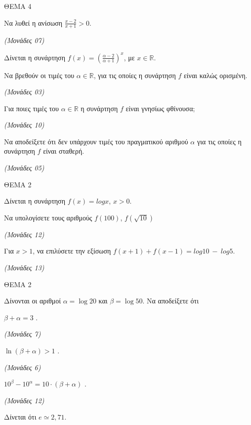\documentclass[11pt,a4paper,twoside]{book}
\newcommand{\monades}[1]{\hfill \textit{(Μονάδες #1)}}
\begin{document}
\vspace{4mm}

ΘΕΜΑ 4

\begin{alist}
\item Να λυθεί η ανίσωση $\frac{x - 2}{x + 1} > 0$.

\monades{07}

\item Δίνεται η συνάρτηση $f(x) = \left(\frac{\alpha - 2}{\alpha + 1}\right)^x$, με $x \in \mathbb{R}$.

\begin{rlist}
\item
  Να βρεθούν οι τιμές του $\alpha \in \mathbb{R}$, για τις οποίες η συνάρτηση $f$ είναι καλώς ορισμένη.

\monades{03}


\item
  Για ποιες τιμές του $\alpha \in \mathbb{R}$ η συνάρτηση $f$ είναι γνησίως φθίνουσα;

\monades{10}


\item
  Να αποδείξετε ότι δεν υπάρχουν τιμές του πραγματικού αριθμού $\alpha$ για τις οποίες η συνάρτηση $f$ είναι σταθερή.

\monades{05}
\end{rlist}
\end{alist}

\vspace{4mm}

ΘΕΜΑ 2

Δίνεται η συνάρτηση $f(x) = logx$, $x > 0$.

\begin{alist}
\item Να υπολογίσετε τους αριθμούς $f(100)$, $f\left( \sqrt{10} \right)$

\monades{12}

\item Για $x > 1$, να επιλύσετε την εξίσωση $f(x + 1) + f(x - 1) = log10\  - \ log5$.

\monades{13}
\end{alist}

\vspace{4mm}

ΘΕΜΑ 2

Δίνονται οι αριθμοί $\alpha = \log 20$ και $\beta = \log 50$. Να αποδείξετε ότι

\begin{alist}
\item $\beta + \alpha = 3$ .

\monades{7}

\item $\ln(\beta + \alpha) > 1$ .

\monades{6}

\item $10^\beta - 10^\alpha = 10 \cdot (\beta + \alpha)$ .

\monades{12}

Δίνεται ότι $e \simeq 2,71$.
\end{alist}
\end{document}

